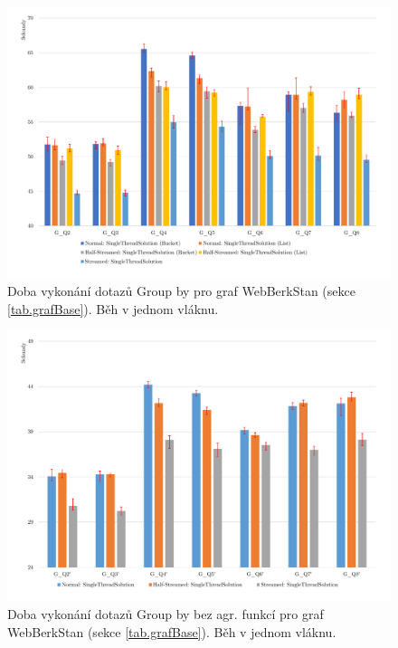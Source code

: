\begin{figure}[!htp]
\includegraphics[width=\linewidth]{../img/webberkstanGroupByST.pdf}\centering
\caption{Doba vykonání dotazů Group by pro graf WebBerkStan (sekce \ref{tab.grafBase}). Běh v jednom vláknu.}
\label{figure.webberkstanGroupByST}
\end{figure}
\begin{figure}[!htp]
\includegraphics[width=\linewidth]{../img/webberkstanGroupBySTNoAgg.pdf}\centering
\caption{Doba vykonání dotazů Group by bez agr. funkcí pro graf WebBerkStan (sekce \ref{tab.grafBase}). Běh v jednom vláknu.}
\label{figure.webberkstanGroupBySTNoAgg}
\end{figure}

